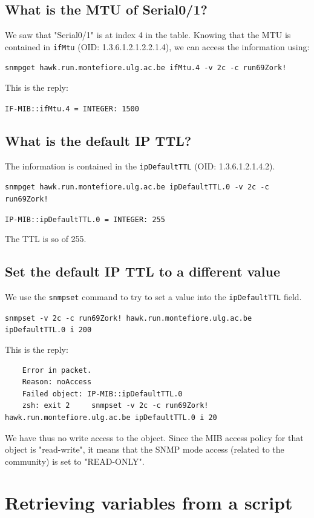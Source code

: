 \documentclass[a4paper,titlepage]{article}
\begin{document}
	\subsection{What is the MTU of Serial0/1?}
We saw that "Serial0/1" is at index 4 in the table. Knowing that the MTU is contained in \texttt{ifMtu} (OID: 1.3.6.1.2.1.2.2.1.4), we can access the information using: 
\begin{center}
	\texttt{snmpget hawk.run.montefiore.ulg.ac.be ifMtu.4 -v 2c -c run69Zork!}
\end{center}
This is the reply: 
\begin{center}
	\texttt{IF-MIB::ifMtu.4 = INTEGER: 1500}
\end{center}

	\subsection{What is the default IP TTL?}
The information is contained in the \texttt{ipDefaultTTL} (OID: 1.3.6.1.2.1.4.2). 

\begin{center}
	\texttt{snmpget hawk.run.montefiore.ulg.ac.be ipDefaultTTL.0 -v 2c -c run69Zork!}
\end{center}
\begin{center}
	\texttt{IP-MIB::ipDefaultTTL.0 = INTEGER: 255}
\end{center}
The TTL is so of 255.

	\subsection{Set the default IP TTL to a different value}
We use the \texttt{snmpset} command to try to set a value into the \texttt{ipDefaultTTL} field.
\begin{center}
	\texttt{snmpset -v 2c -c run69Zork! hawk.run.montefiore.ulg.ac.be ipDefaultTTL.0 i 200}
\end{center}
This is the reply:
\begin{verbatim}
	Error in packet.
	Reason: noAccess
	Failed object: IP-MIB::ipDefaultTTL.0
	zsh: exit 2     snmpset -v 2c -c run69Zork! hawk.run.montefiore.ulg.ac.be ipDefaultTTL.0 i 20
\end{verbatim}
We have thus no write access to the object. Since the MIB access policy for that object is "read-write", it means that the SNMP mode access (related to the community) is set to "READ-ONLY".

\section{Retrieving variables from a script}


\newpage
\end{document}
